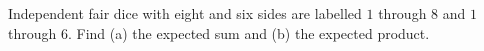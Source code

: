 Independent fair dice with eight and six sides are labelled $1$ through $8$ and $1$ through $6$. Find (a) the expected sum and (b) the expected product.
